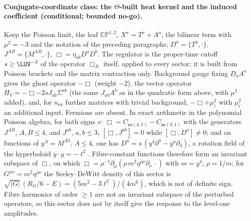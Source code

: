 \paragraph{Conjugate-coordinate class: the \(\Theta\)-built heat kernel and the induced coefficient (conditional; bounded no-go).}
Keep the Poisson limit, the leaf \(\mathbb{CP}^{1,2}\), \(X^a=T^a+A^a\), the bilinear term with \(\mu^2=-3\) and the notation of the preceding paragraphs; \(D^a=\{T^a,\cdot\}\), \(J^{AB}=\{M^{AB},\cdot\}\), \(\Box=\eta_{ab}D^aD^b\). The regulator is the proper-time cutoff \(s\ge\LUV^{-2}\) of the operator \(\Box_X\) itself, applied to every sector; it is built from Poisson brackets and the matrix contraction only. Background gauge fixing \(D_aA^a\) gives the ghost operator \(-\Box\) (weight \(-2\)), the vector operator \(H_V=-\Box-2sJ_{ab}\Sigma^{ab}\) (the same \(J_{ab}A^b\) as in the quadratic form above, with \(\mu^2\) added), and, for \(n_{\mathrm{ex}}\) further matrices with trivial background, \(-\Box+\mu_i^2\) with \(\mu_i^2\) an additional input. Fermions are absent. In exact arithmetic in the polynomial Poisson algebra, for both signs \(s\): \(\Box=C_{\mathfrak{so}(4,1)}-C_{\mathfrak{so}(3,1)}\) with the generators \(J^{AB}\), \(A,B\le4\), and \(J^{ab}\), \(a,b\le3\); \([\Box,J^{ab}]=0\) while \([\Box,D^a]\ne0\); and on functions of \(y^A=M^{A5}\), \(A\le4\), one has \(D^a=s\,(y^4\partial^a-y^a\partial_4)\), a rotation field of the hyperboloid \(y\cdot y=-\ell^2\). Fibre-constant functions therefore form an invariant subspace of \(\Box\), on which \(\Box=\rho^{-1}\partial_\mu(\rho\,m^2\eta^{\mu\nu}\partial_\nu\,\cdot)\) with \(m=y^4\), \(\rho=1/m\); for \(G^{\mu\nu}=m^2\eta^{\mu\nu}\) the Seeley--DeWitt density of this sector is \(\sqrt{|G|}\,(R_G/6-E)=(5m^2-3\ell^2)/(4m^6)\), which is not of definite sign. Fibre harmonics of order \(\ge1\) are not an invariant subspace of the perturbed operators, so this sector does not by itself give the response to the level-one amplitudes.

